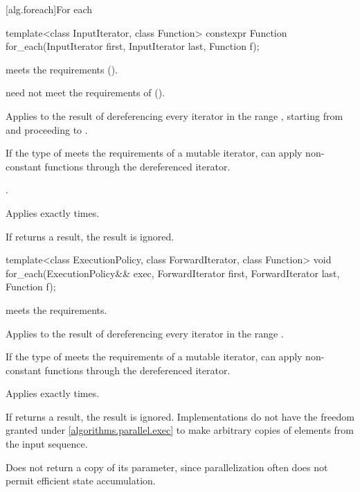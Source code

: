 [alg.foreach]{For each}

%
\begin{itemdecl}
template<class InputIterator, class Function>
  constexpr Function for_each(InputIterator first, InputIterator last, Function f);
\end{itemdecl}

\begin{itemdescr}
\pnum
\expects
{} meets
the  requirements ().
\begin{note}
 need not meet the requirements of
 ().
\end{note}

\pnum
\effects
Applies  to the result of dereferencing
every iterator in the range ,
starting from  and proceeding to .
\begin{note}
If the type of  meets the requirements of a mutable iterator,
 can apply non-constant functions through the dereferenced iterator.
\end{note}

\pnum
\returns
{}.

\pnum
\complexity
Applies  exactly  times.

\pnum
\remarks
If  returns a result, the result is ignored.
\end{itemdescr}

%
\begin{itemdecl}
template<class ExecutionPolicy, class ForwardIterator, class Function>
  void for_each(ExecutionPolicy&& exec,
                ForwardIterator first, ForwardIterator last,
                Function f);
\end{itemdecl}

\begin{itemdescr}
\pnum
\expects
{} meets the  requirements.

\pnum
\effects
Applies  to the result of dereferencing
every iterator in the range .
\begin{note}
If the type of  meets the requirements of a mutable iterator,
 can apply non-constant functions through the dereferenced iterator.
\end{note}

\pnum
\complexity
Applies  exactly  times.

\pnum
\remarks
If  returns a result, the result is ignored.
Implementations do not have
the freedom granted under \ref{algorithms.parallel.exec}
to make arbitrary copies of elements from the input sequence.

\pnum
\begin{note}
Does not return a copy of its  parameter,
since parallelization often does not permit efficient state accumulation.
\end{note}
\end{itemdescr}

